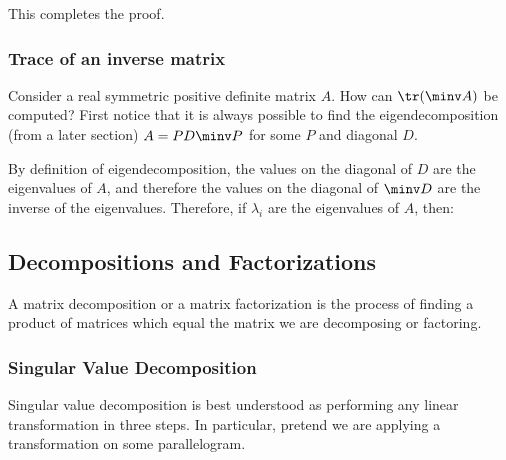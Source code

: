 \documentclass[12pt]{article}
\begin{document}
This completes the proof.

\subsubsection{Trace of an inverse matrix}

Consider a real symmetric positive definite matrix $A$. How can $\tr(\minv A)$ be computed? First notice that it is always possible to find the eigendecomposition (from a later section) $A = P D \minv P$ for some $P$ and diagonal $D$. 


By definition of eigendecomposition, the values on the diagonal of $D$ are the eigenvalues of $A$, and therefore the values on the diagonal of $\minv D$ are the inverse of the eigenvalues. Therefore, if $\lambda_i$ are the eigenvalues of $A$, then:


\subsection{Decompositions and Factorizations}

A matrix decomposition or a matrix factorization is the process of finding a product of matrices which equal the matrix we are decomposing or factoring.

\subsubsection{Singular Value Decomposition}


Singular value decomposition is best understood as performing any linear transformation in three steps. In particular, pretend we are applying a transformation on some parallelogram.

\end{document}
